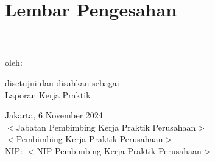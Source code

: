 \chapter*{
\large{Lembar Pengesahan} \\ 
\thetitle \\
\vspace{5pt}
\perusahaanKP}

\vspace{8em}

\begin{center}
oleh:\\
\theauthor
\end{center}

\vspace{5em}
\begin{center}
    disetujui dan disahkan sebagai\\
    Laporan Kerja Praktik
\end{center}

\vspace{5em}
\begin{flushleft}
Jakarta, 6 November 2024\\
$<$Jabatan Pembimbing Kerja Praktik Perusahaan$>$\\
\vspace{5em}
\underline{$<$Pembimbing Kerja Praktik Perusahaan$>$}\\
NIP: $<$NIP Pembimbing Kerja Praktik Perusahaan$>$
\end{flushleft}